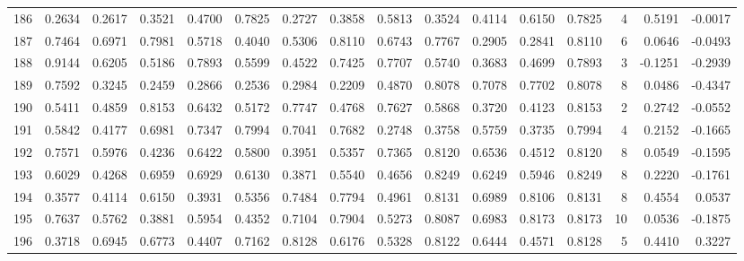 \begin{tabular}{lrrrrrrrrrrrrrrr}
186 &      0.2634 &  0.2617 &  0.3521 &  0.4700 &  0.7825 &  0.2727 &  0.3858 &  0.5813 &  0.3524 &  0.4114 &   0.6150 &     0.7825 &      4 &                    0.5191 &                    -0.0017 \\
187 &      0.7464 &  0.6971 &  0.7981 &  0.5718 &  0.4040 &  0.5306 &  0.8110 &  0.6743 &  0.7767 &  0.2905 &   0.2841 &     0.8110 &      6 &                    0.0646 &                    -0.0493 \\
188 &      0.9144 &  0.6205 &  0.5186 &  0.7893 &  0.5599 &  0.4522 &  0.7425 &  0.7707 &  0.5740 &  0.3683 &   0.4699 &     0.7893 &      3 &                   -0.1251 &                    -0.2939 \\
189 &      0.7592 &  0.3245 &  0.2459 &  0.2866 &  0.2536 &  0.2984 &  0.2209 &  0.4870 &  0.8078 &  0.7078 &   0.7702 &     0.8078 &      8 &                    0.0486 &                    -0.4347 \\
190 &      0.5411 &  0.4859 &  0.8153 &  0.6432 &  0.5172 &  0.7747 &  0.4768 &  0.7627 &  0.5868 &  0.3720 &   0.4123 &     0.8153 &      2 &                    0.2742 &                    -0.0552 \\
191 &      0.5842 &  0.4177 &  0.6981 &  0.7347 &  0.7994 &  0.7041 &  0.7682 &  0.2748 &  0.3758 &  0.5759 &   0.3735 &     0.7994 &      4 &                    0.2152 &                    -0.1665 \\
192 &      0.7571 &  0.5976 &  0.4236 &  0.6422 &  0.5800 &  0.3951 &  0.5357 &  0.7365 &  0.8120 &  0.6536 &   0.4512 &     0.8120 &      8 &                    0.0549 &                    -0.1595 \\
193 &      0.6029 &  0.4268 &  0.6959 &  0.6929 &  0.6130 &  0.3871 &  0.5540 &  0.4656 &  0.8249 &  0.6249 &   0.5946 &     0.8249 &      8 &                    0.2220 &                    -0.1761 \\
194 &      0.3577 &  0.4114 &  0.6150 &  0.3931 &  0.5356 &  0.7484 &  0.7794 &  0.4961 &  0.8131 &  0.6989 &   0.8106 &     0.8131 &      8 &                    0.4554 &                     0.0537 \\
195 &      0.7637 &  0.5762 &  0.3881 &  0.5954 &  0.4352 &  0.7104 &  0.7904 &  0.5273 &  0.8087 &  0.6983 &   0.8173 &     0.8173 &     10 &                    0.0536 &                    -0.1875 \\
196 &      0.3718 &  0.6945 &  0.6773 &  0.4407 &  0.7162 &  0.8128 &  0.6176 &  0.5328 &  0.8122 &  0.6444 &   0.4571 &     0.8128 &      5 &                    0.4410 &                     0.3227 \\

\end{tabular}
